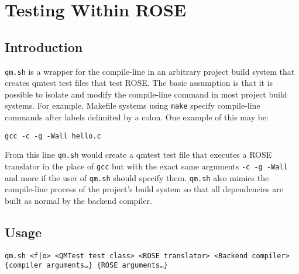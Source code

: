 %
%

\chapter{Testing Within ROSE}

\label{testing::overviewOfTesting}

{\scriptsize  }

\section{Introduction}
{\tt qm.sh} is a wrapper for the compile-line in an arbitrary project build 
system that creates qmtest test files that test ROSE. The basic assumption
is that it is possible to isolate and modify the compile-line command in most
project build systems. For example, Makefile systems using {\tt make} specify
compile-line commands after labels delimited by a colon. One example of this
may be:

\begin{center}
  {\tt gcc -c -g -Wall hello.c}
\end{center}
From this line {\tt qm.sh} would create a qmtest test file that executes
a ROSE translator in the place of {\tt gcc} but with the exact same arguments
{\tt -c -g -Wall} and more if the user of {\tt qm.sh} should specify them.
{\tt qm.sh} also mimics the compile-line process of the project's build system
so that all dependencies are built as normal by the backend compiler.

\section{Usage}

{\tt qm.sh <f|o> <QMTest test class> <ROSE translator> <Backend compiler> 
\{compiler arguments\ldots\} \{ROSE arguments\ldots\}}


